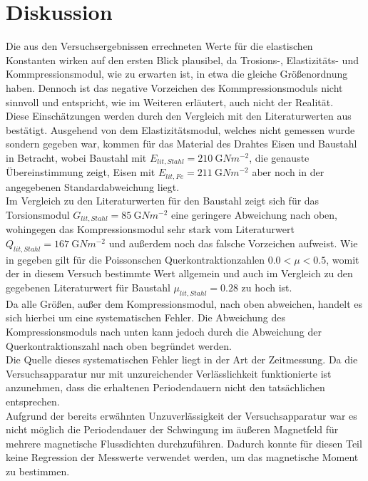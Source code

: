   
 
  
  \newpage
  \section{Diskussion}
    Die aus den Versuchsergebnissen errechneten Werte für die elastischen Konstanten wirken auf den ersten Blick plausibel,
    da Trosions-, Elastizitäts- und Kommpressionsmodul, wie zu erwarten ist, in etwa die gleiche Größenordnung haben. Dennoch 
    ist das negative Vorzeichen des Kommpressionsmoduls nicht sinnvoll und entspricht, wie im Weiteren erläutert, auch nicht der Realität.\\
    
    Diese Einschätzungen werden durch den Vergleich mit den Literaturwerten aus\,\cite{Kuchling07} bestätigt. Ausgehend von dem Elastizitätsmodul,
    welches nicht gemessen wurde sondern gegeben war, kommen für das Material des Drahtes Eisen und Baustahl in Betracht,
    wobei Baustahl mit $E_{lit,Stahl} = \SI{210}{\giga Nm^{-2}}$, die genauste Übereinstimmung zeigt, 
    Eisen mit $E_{lit,Fe} = \SI{211}{\giga Nm^{-2}}$ aber noch in der angegebenen Standardabweichung liegt.\\
    Im Vergleich zu den Literaturwerten für den Baustahl zeigt sich für das Torsionsmodul $G_{lit,Stahl} =\SI{85}{\giga Nm^{-2}}$ eine 
    geringere Abweichung nach oben, wohingegen das Kompressionsmodul sehr stark vom Literaturwert $Q_{lit,Stahl} =\SI{167}{\giga Nm^{-2}}$
    und außerdem noch das falsche Vorzeichen aufweist. Wie in \cite[S.189]{Kuchling07} gegeben gilt für die Poissonschen Querkontraktionzahlen
    $\num{0,0} < \mu < \num{0,5} $, womit der in diesem Versuch bestimmte Wert allgemein und auch im Vergleich zu den gegebenen Literaturwert
    für Baustahl $\mu_{lit,Stahl} =\num{0,28}$ zu hoch ist.\\
    
    Da alle Größen, außer dem Kompressionsmodul, nach oben abweichen, handelt es sich hierbei um eine systematischen Fehler.
    Die Abweichung des Kompressionsmoduls nach unten kann jedoch durch die Abweichung der Querkontraktionszahl nach oben begründet werden.\\
    Die Quelle dieses systematischen Fehler liegt in der Art der Zeitmessung. Da die Versuchsapparatur nur mit unzureichender Verlässlichkeit
    funktionierte ist anzunehmen, dass die erhaltenen Periodendauern nicht den tatsächlichen entsprechen.\\
    
    Aufgrund der bereits erwähnten Unzuverlässigkeit der Versuchsapparatur war es nicht möglich die Periodendauer der
    Schwingung im äußeren Magnetfeld für mehrere magnetische Flussdichten durchzuführen. Dadurch konnte für diesen
    Teil keine Regression der Messwerte verwendet werden, um das magnetische Moment zu bestimmen.
  
